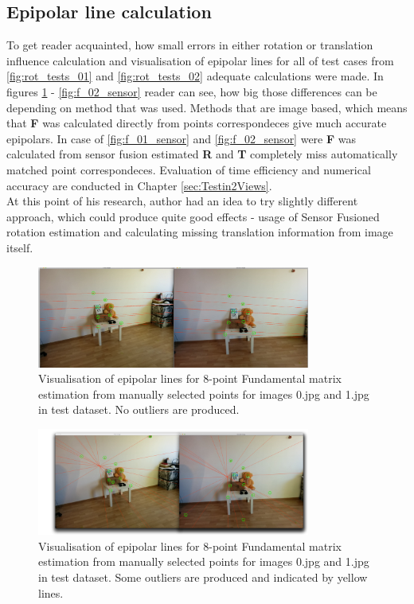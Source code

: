 \subsection{Epipolar line calculation}
To get reader acquainted, how small errors in either rotation or translation influence calculation and visualisation of epipolar lines for all of test cases from \ref{fig:rot_tests_01} and \ref{fig:rot_tests_02} adequate calculations were made. In figures \ref{fig:f_01_epi} - \ref{fig:f_02_sensor} reader can see, how big those differences can be depending on method that was used. Methods that are image based, which means that \textbf{F} was calculated directly from points correspondeces give much accurate epipolars. In case of \ref{fig:f_01_sensor} and \ref{fig:f_02_sensor} were \textbf{F} was calculated from sensor fusion estimated \textbf{R} and \textbf{T} completely miss automatically matched point correspondeces. Evaluation of time efficiency and numerical accuracy are conducted in Chapter \ref{sec:Testin2Views}. \\
At this point of his research, author had an idea to try slightly different approach, which could produce quite good effects - usage of Sensor Fusioned rotation estimation and calculating missing translation information from image itself. 
\begin{figure}[h!]
    \centering
    \includegraphics[width=0.8\textwidth]{f_01}
    \caption[Visualisation of epipolar lines for 8-point Fundamental matrix estimation - 1st example]{Visualisation of epipolar lines for 8-point Fundamental matrix estimation from manually selected points for images 0.jpg and 1.jpg in test dataset. No outliers are produced.}
    \label{fig:f_01_epi}
\end{figure}

\begin{figure}[h!]
    \centering
    \includegraphics[width=0.8\textwidth]{01_matching_outliers_epi}
    \caption[Visualisation of epipolar lines for 8-point Fundamental matrix estimation with outliers - 1st example]{Visualisation of epipolar lines for 8-point Fundamental matrix estimation from manually selected points for images 0.jpg and 1.jpg in test dataset. Some outliers are produced and indicated by yellow lines.}
    \label{fig:01_matching_outliers_epi}
\end{figure}

